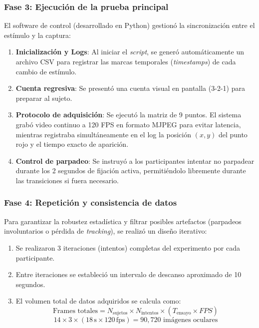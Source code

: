 \subsubsection{Fase 3: Ejecución de la prueba principal}

El software de control (desarrollado en Python) gestionó la sincronización entre el estímulo y la captura:

\begin{enumerate}
	\item \textbf{Inicialización y Logs}: Al iniciar el \textit{script}, se generó automáticamente un archivo CSV para registrar las marcas temporales (\textit{timestamps}) de cada cambio de estímulo.
	\item \textbf{Cuenta regresiva}: Se presentó una cuenta visual en pantalla (3-2-1) para preparar al sujeto.
	\item \textbf{Protocolo de adquisición}: Se ejecutó la matriz de 9 puntos.
	El sistema grabó video continuo a 120 FPS en formato MJPEG para evitar latencia, mientras registraba simultáneamente en el log la posición $(x,y)$ del punto rojo y el tiempo exacto de aparición.
	\item \textbf{Control de parpadeo}: Se instruyó a los participantes intentar no parpadear durante los 2 segundos de fijación activa, permitiéndolo libremente durante las transiciones si fuera necesario.
\end{enumerate}

\subsubsection{Fase 4: Repetición y consistencia de datos}

Para garantizar la robustez estadística y filtrar posibles artefactos (parpadeos involuntarios o pérdida de \textit{tracking}), se realizó un diseño iterativo:

\begin{enumerate}
	\item Se realizaron 3 iteraciones (intentos) completas del experimento por cada participante.
	\item Entre iteraciones se estableció un intervalo de descanso aproximado de 10 segundos.
	\item El volumen total de datos adquiridos se calcula como:
	\[
	\text{Frames totales} = N_{\text{sujetos}} \times N_{\text{intentos}} \times (T_{\text{ensayo}} \times FPS)
	\]
	\[
	14 \times 3 \times (18\,\text{s} \times 120\,\text{fps}) = 90,720 \text{ imágenes oculares}
	\]
\end{enumerate}


